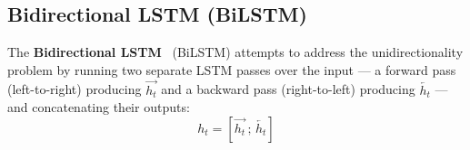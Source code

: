 \subsection{Bidirectional LSTM (BiLSTM)}
\label{subsec:bilstm}

The \textbf{Bidirectional LSTM}~\cite{schuster1997bilstm} (BiLSTM) attempts to
address the unidirectionality problem by running two separate LSTM passes over
the input --- a forward pass (left-to-right) producing $\overrightarrow{h_t}$
and a backward pass (right-to-left) producing $\overleftarrow{h_t}$ --- and
concatenating their outputs:
\begin{equation}
  h_t = \left[\overrightarrow{h_t}\,;\,\overleftarrow{h_t}\right]
  \label{eq:bilstm}
\end{equation}

